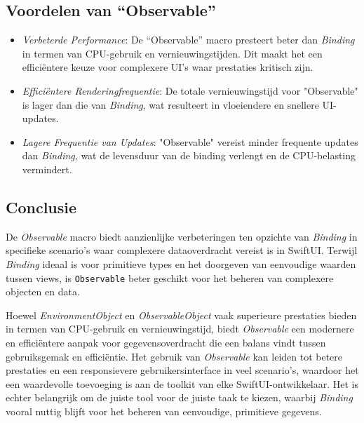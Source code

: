\subsection{Voordelen van ``Observable''}
\begin{itemize}
    \item \textit{Verbeterde Performance}: De ``Observable'' macro presteert beter dan \textit{Binding} in termen van CPU-gebruik en vernieuwingstijden. Dit maakt het een efficiëntere keuze voor complexere UI's waar prestaties kritisch zijn.
    \item \textit{Efficiëntere Renderingfrequentie}: De totale vernieuwingstijd voor "Observable" is lager dan die van \textit{Binding}, wat resulteert in vloeiendere en snellere UI-updates.
    \item \textit{Lagere Frequentie van Updates}: "Observable" vereist minder frequente updates dan \textit{Binding}, wat de levensduur van de binding verlengt en de CPU-belasting vermindert.
\end{itemize}

\subsection{Conclusie}
De \textit{Observable} macro biedt aanzienlijke verbeteringen ten opzichte van \textit{Binding} in specifieke scenario's waar complexere dataoverdracht vereist is in SwiftUI. Terwijl \textit{Binding} ideaal is voor primitieve types en het doorgeven van eenvoudige waarden tussen views, is \texttt{Observable} beter geschikt voor het beheren van complexere objecten en data. 

Hoewel \textit{EnvironmentObject} en \textit{ObservableObject} vaak superieure prestaties bieden in termen van CPU-gebruik en vernieuwingstijd, biedt \textit{Observable} een modernere en efficiëntere aanpak voor gegevensoverdracht die een balans vindt tussen gebruiksgemak en efficiëntie. Het gebruik van \textit{Observable} kan leiden tot betere prestaties en een responsievere gebruikersinterface in veel scenario's, waardoor het een waardevolle toevoeging is aan de toolkit van elke SwiftUI-ontwikkelaar. Het is echter belangrijk om de juiste tool voor de juiste taak te kiezen, waarbij \textit{Binding} vooral nuttig blijft voor het beheren van eenvoudige, primitieve gegevens.



\newpage
